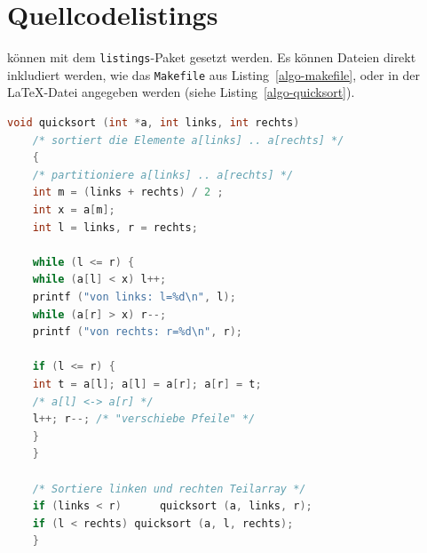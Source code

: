 
\section{Quellcodelistings}

 können mit dem \texttt{listings}-Paket gesetzt werden.
Es können Dateien direkt inkludiert werden, wie das \texttt{Makefile} aus
Listing~\ref{algo-makefile}, oder in der \LaTeX-Datei angegeben werden (siehe
Listing~\ref{algo-quicksort}).


\begin{lstlisting}[language=c,
frame=single,           % Ein Rahmen um den Code
framexleftmargin=15pt,  % Rahmen link von den Zahlen
style=algoBericht,
label={algo-quicksort},
captionpos=b,           % Caption unter den Code setzen
caption={quicksort in C}]
    void quicksort (int *a, int links, int rechts)
    /* sortiert die Elemente a[links] .. a[rechts] */
    {
    /* partitioniere a[links] .. a[rechts] */
    int m = (links + rechts) / 2 ;
    int x = a[m];
    int l = links, r = rechts;

    while (l <= r) {
    while (a[l] < x) l++;
    printf ("von links: l=%d\n", l);
    while (a[r] > x) r--;
    printf ("von rechts: r=%d\n", r);

    if (l <= r) {
    int t = a[l]; a[l] = a[r]; a[r] = t;
    /* a[l] <-> a[r] */
    l++; r--; /* "verschiebe Pfeile" */
    }
    }

    /* Sortiere linken und rechten Teilarray */
    if (links < r)      quicksort (a, links, r);
    if (l < rechts) quicksort (a, l, rechts);
    }
\end{lstlisting}

